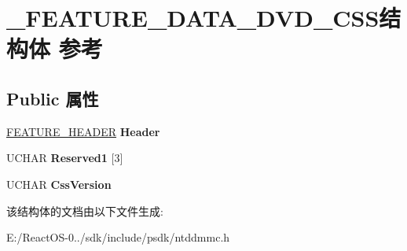 \hypertarget{struct___f_e_a_t_u_r_e___d_a_t_a___d_v_d___c_s_s}{}\section{\+\_\+\+F\+E\+A\+T\+U\+R\+E\+\_\+\+D\+A\+T\+A\+\_\+\+D\+V\+D\+\_\+\+C\+S\+S结构体 参考}
\label{struct___f_e_a_t_u_r_e___d_a_t_a___d_v_d___c_s_s}
\subsection*{Public 属性}
\begin{DoxyCompactItemize}
\item 
\mbox{\label{struct___f_e_a_t_u_r_e___d_a_t_a___d_v_d___c_s_s_afb7d0efbdf5c59eb2b673c6ec18e1325}} 
\hyperlink{struct___f_e_a_t_u_r_e___h_e_a_d_e_r}{F\+E\+A\+T\+U\+R\+E\+\_\+\+H\+E\+A\+D\+ER} {\bfseries Header}
\item 
\mbox{\label{struct___f_e_a_t_u_r_e___d_a_t_a___d_v_d___c_s_s_a370d65f57ee054f6c10c98cb69b562b2}} 
U\+C\+H\+AR {\bfseries Reserved1} \mbox{[}3\mbox{]}
\item 
\mbox{\label{struct___f_e_a_t_u_r_e___d_a_t_a___d_v_d___c_s_s_a72dc6f2b62979b7a905440c30092854e}} 
U\+C\+H\+AR {\bfseries Css\+Version}
\end{DoxyCompactItemize}


该结构体的文档由以下文件生成\+:\begin{DoxyCompactItemize}
\item 
E\+:/\+React\+O\+S-\/0../sdk/include/psdk/ntddmmc.\+h\end{DoxyCompactItemize}
